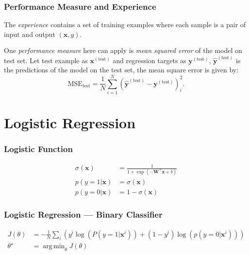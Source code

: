 \documentclass{beamer}
\DeclareMathOperator*{\argmin}{arg\,min}
\begin{document}
\begin{frame}
  \frametitle{Performance Measure and Experience}

  The \emph{experience} contains a set of training examples where each sample is a pair of input and output $(\mathbf{x}, y)$.

  One \emph{performance measure} here can apply is \emph{mean squared error} of the model on test set. Let test example as $\mathbf{x}^{(\text{test})}$ and regression targets as $\mathbf{y}^{(\text{test})}$, $\hat{\mathbf{y}}^{(\text{test})}$ is the predictions of the model on the test set, the mean square error is given by:
  \begin{equation*}
      \text{MSE}_{\text{test}}=\frac{1}{N}\sum_{i=1}^{N}(\hat{\mathbf{y}}^{(\text{test})}-\mathbf{y}^{(\text{test})})_{i}^{2}.
  \end{equation*}
\end{frame}

\section{Logistic Regression}

\begin{frame}
  \frametitle{Logistic Function}

  \begin{align*}
    \sigma(\mathbf{x})&=\frac{1}{1+\exp(-\mathbf{W}^{\top}\mathbf{x}+b)} \\
    p(y=1|\mathbf{x})&=\sigma(\mathbf{x})\\
    p(y=0|\mathbf{x})&=1-\sigma(\mathbf{x})
  \end{align*}
\end{frame}

\begin{frame}
  \frametitle{Logistic Regression --- Binary Classifier}

  \begin{align*}
    J(\theta)&=-\frac{1}{N}\sum_{i}\left(y^{i}\log(P(y=1|\mathbf{x}^{i}))+(1-y^{i})\log(p(y=0|\mathbf{x}^{i}))\right) \\
    \theta^{\star}&=\argmin_{\theta}J(\theta)
  \end{align*}
\end{frame}
\end{document}
